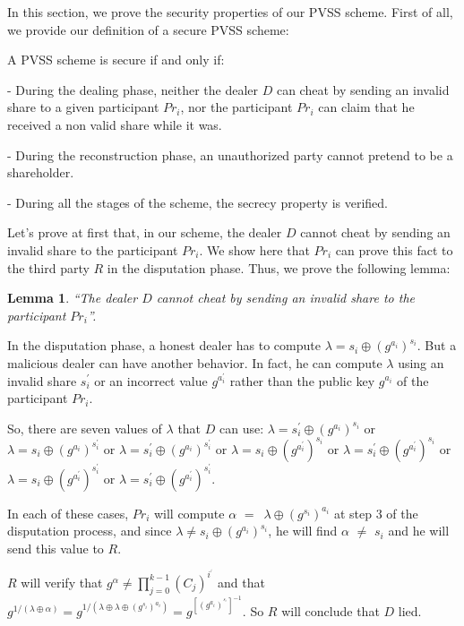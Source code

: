 \documentclass[submission,copyright,creativecommons]{eptcs}
\newtheorem{lemma}[theorem]{Lemma}
\newenvironment{proof}[1][Proof]{\begin{trivlist}
\item[\hskip \labelsep {\bfseries #1}]}{\end{trivlist}}
\newenvironment{definition}[1][Definition]{\begin{trivlist}
\item[\hskip \labelsep {\bfseries #1}]}{\end{trivlist}}
\begin{document}
In this section, we prove the security properties of our PVSS scheme. First
of all, we provide our definition of a secure PVSS scheme:

\begin{definition}
A PVSS scheme is secure if and only if:

- During the dealing phase, neither the dealer $D$ can cheat by sending an
invalid share to a given participant $Pr_{i}$, nor the participant $Pr_{i}$
can claim that he received a non valid share while it was.

- During the reconstruction phase, an unauthorized party cannot pretend to
be a shareholder.

- During all the stages of the scheme, the secrecy property is verified.
\end{definition}

Let's prove at first that, in our scheme, the dealer $D$ cannot cheat by
sending an invalid share to the participant $Pr_{i}$. We show here that $Pr_{i}$ can prove this fact to the third party $R$ in the disputation phase.
Thus, we prove the following lemma:

\begin{lemma}
\textquotedblleft The dealer $D$ cannot cheat by sending an invalid share to
the participant $Pr_{i}$\textquotedblright .
\end{lemma}

\begin{proof}
In the disputation phase, a honest dealer has to compute $\lambda
=s_{i}\oplus (g^{a_{i}})^{s_{i}}$. But a malicious dealer can have another
behavior. In fact, he can compute $\lambda $ using an invalid share $s_{i}^{\prime }$ or an incorrect value $g^{a_{i}^{\prime }}$ rather than the
public key $g^{a_{i}}$ of the participant $Pr_{i}$.

So, there are seven values of $\lambda $ that $D$ can use: $\lambda
=s_{i}^{\prime }\oplus (g^{a_{i}})^{s_{i}}$ or $\lambda =s_{i}\oplus
(g^{a_{i}})^{s_{i}^{\prime }}$ or $\lambda =s_{i}^{\prime }\oplus
(g^{a_{i}})^{s_{i}^{\prime }}$ or $\lambda =s_{i}\oplus (g^{a_{i}^{\prime
}})^{s_{i}}$ or $\lambda =s_{i}^{\prime }\oplus (g^{a_{i}^{\prime
}})^{s_{i}} $ or $\lambda =s_{i}\oplus (g^{a_{i}^{\prime }})^{s_{i}^{\prime
}}$ or $\lambda =s_{i}^{\prime }\oplus (g^{a_{i}^{\prime }})^{s_{i}^{\prime
}}$.

In each of these cases, $Pr_{i}$ will compute $\alpha $ $=$\ $\lambda \oplus
(g^{s_{i}})^{a_{i}}$ at step $3$ of the disputation process, and since $\lambda \neq s_{i}\oplus (g^{a_{i}})^{s_{i}}$, he will find $\alpha $ $\neq $
$s_{i}$ and he will send this value to $R$.

$R$ will verify that $g^{\alpha }\neq
\prod_{j=0}^{k-1}(C_{j})^{i^{^{_{j}}}}$ and that $g^{1/(\lambda \oplus
\alpha )}=g^{1/(\lambda \oplus \lambda \oplus
(g^{s_{i}})^{a_{i}})}=g^{[(g^{a_{i}})^{^{s_{i}}}]^{-1}}$. So $R$ will
conclude that $D$ lied.
\end{proof}
\end{document}
